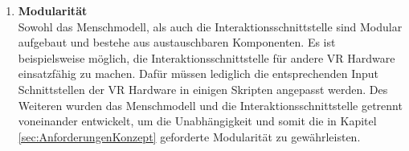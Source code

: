 \begin{enumerate}
	\item \textbf{Modularität} \\
	Sowohl das Menschmodell, als auch die Interaktionsschnittstelle sind Modular aufgebaut und bestehe aus austauschbaren Komponenten. Es ist beispielsweise möglich, die Interaktionsschnittstelle für andere VR Hardware einsatzfähig zu machen. Dafür müssen lediglich die entsprechenden Input Schnittstellen der VR Hardware in einigen Skripten angepasst werden. Des Weiteren wurden das Menschmodell und die Interaktionsschnittstelle getrennt voneinander entwickelt, um die Unabhängigkeit und somit die in Kapitel \ref{sec:AnforderungenKonzept} geforderte Modularität zu gewährleisten.
\end{enumerate}

